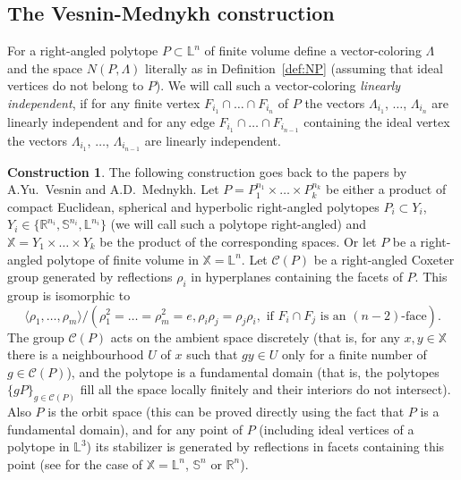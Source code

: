 \documentclass[12pt]{amsart}
\theoremstyle{definition}
\newtheorem{construction}[formula]{Construction}
\theoremstyle{remark}
\begin{document}
\subsection{The Vesnin-Mednykh construction}
For a right-angled polytope $P\subset\mathbb L^n$ of finite volume define a vector-coloring
$\Lambda$ and the space $N(P,\Lambda)$ literally as in Definition~\ref{def:NP} 
(assuming that ideal vertices do not belong to $P$). We will call such a vector-coloring
{\it linearly independent}, if for any finite vertex $F_{i_1}\cap \dots \cap F_{i_n}$  of $P$ the vectors 
$\Lambda_{i_1}$, $\dots$, $\Lambda_{i_n}$ are linearly independent 
and for any edge $F_{i_1}\cap\dots\cap F_{i_{n-1}}$ containing the ideal vertex 
the vectors $\Lambda_{i_1}$, $\dots$, $\Lambda_{i_{n-1}}$ are linearly independent.

\begin{construction}\label{VMC}
The following construction goes back to the papers \cite{M85,MV86,V87, M90, VM99S2, V17} by A.Yu.~Vesnin and A.D.~Mednykh.
Let $P=P_1^{n_1}\times\dots\times P_k^{n_k}$ 
be either a product of compact Euclidean, spherical and hyperbolic right-angled polytopes $P_i\subset Y_i$,
$Y_i\in\{\mathbb R^{n_i},\mathbb S^{n_i},\mathbb L^{n_i}\}$
(we will call such a polytope right-angled) 
and $\mathbb X=Y_1\times\dots\times Y_k$ 
be the product of the corresponding spaces. Or  let $P$ be a right-angled polytope of finite volume in 
$\mathbb X=\mathbb L^n$.
Let $\mathcal{C}(P)$ be a right-angled Coxeter group generated by reflections $\rho_i$ in hyperplanes containing
the facets of $P$. This group is isomorphic to
$$
\langle \rho_1,\dots,\rho_m\rangle/(\rho_1^2=\dots=\rho_m^2=e, \rho_i\rho_j=\rho_j\rho_i,
\text{ if }F_i\cap F_j \text{ is an $(n-2)$-face}).
$$
The group $\mathcal{C}(P)$ acts on the ambient space discretely (that is, for any $x, y\in \mathbb X$ there is a neighbourhood
$U$ of $x$ such that $gy\in U$ only for a finite number of $g\in \mathcal{C}(P)$), and the polytope is a fundamental domain (that is, the polytopes $\{gP\}_{g\in \mathcal{C}(P)}$ fill all the space locally finitely and their interiors do not intersect). Also $P$ is the orbit space (this can be proved directly using the fact that $P$ is a fundamental domain), and for any point of $P$  (including ideal vertices of a polytope in $\mathbb L^3$) its stabilizer is generated by reflections in facets containing this point (see \cite[Theorem 1.2 in Chapter 5]{VS88} for
the case of $\mathbb X=\mathbb L^n$, $\mathbb S^n$ or $\mathbb R^n$).


\end{construction}
\end{document}
